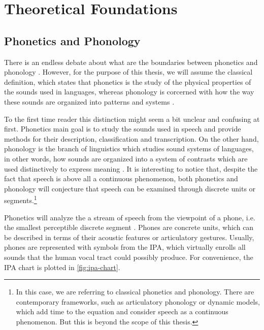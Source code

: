 \chapter{Theoretical Foundations}\label{ch:foundations}

\section{Phonetics and Phonology}\label{sec:phonetics-phonology}

There is an endless debate about what are the boundaries between phonetics and phonology \cite{Steriade2000}. However, for the purpose of this thesis, we will assume the classical definition, which states that phonetics is the study of the physical properties of the sounds used in languages, whereas phonology is corcerned with how the way these sounds are organized into patterns and systems \cite{Davenport2010}.

To the first time reader this distinction might seem a bit unclear and confusing at first. Phonetics main goal is to study the sounds used in speech and provide methods for their description, classification and transcription. On the other hand, phonology is the branch of linguistics which studies sound systems of languages, in other words, how sounds are organized into a system of contrasts which are used distinctively to express meaning \cite{Crystal2011}. It is interesting to notice that, despite the fact that speech is above all a continuous phenomenon, both phonetics and phonology will conjecture that speech can be examined through discrete units or segments.\footnote{In this case, we are referring to classical phonetics and phonology. There are contemporary frameworks, such as articulatory phonology or dynamic models, which add time to the equation and consider speech as a continuous phenomenon. But this is beyond the scope of this thesis.}

Phonetics will analyze the a stream of speech from the viewpoint of a phone, i.e. the smallest perceptible discrete segment \cite{Crystal2011}. Phones are concrete units, which can be described in terms of their acoustic features or articulatory gestures. Usually, phones are represented with symbols from the \ac{IPA}, which virtually enrolls all sounds that the human vocal tract could possibly produce. For convenience, the \ac{IPA} chart is plotted in \autoref{fig:ipa-chart}.

